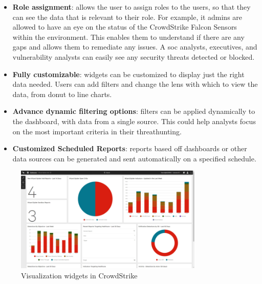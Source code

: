 \begin{multicols}{2}
      \begin{itemize}
            \item \textbf{Role assignment}: allows the user to assign roles to the users, so that they can see
                  the data that is relevant to their role. For example, \acrshort{it} admins are allowed to have
                  an eye on the status of the CrowdStrike Falcon Sensors within the environment. This enables them
                  to  understand if there are any gaps and allows them to remediate any issues. A \acrshort{soc}
                  analysts, executives, and vulnerability analysts can easily see any security threats detected
                  or blocked.
            \item \textbf{Fully customizable}: widgets can be customized to display just the right data needed.
                  Users can add filters and change the lens with which to view the data, from donut to line charts.
            \item \textbf{Advance dynamic filtering options}: filters can be applied dynamically to the dashboard,
                  with data from a single source. This could help analysts focus on the most important criteria
                  in their \gls{threathunting}.
            \item \textbf{Customized Scheduled Reports}: reports based off dashboards or other data sources can
                  be generated and sent automatically on a specified schedule.
      \end{itemize}
\end{multicols}

\begin{figure}[htbp]
      \centering
      \includegraphics[width=0.8\textwidth]{Figures/CrowdStrike/visualization-widgets.png}
      \caption{Visualization widgets in CrowdStrike}
\end{figure}

